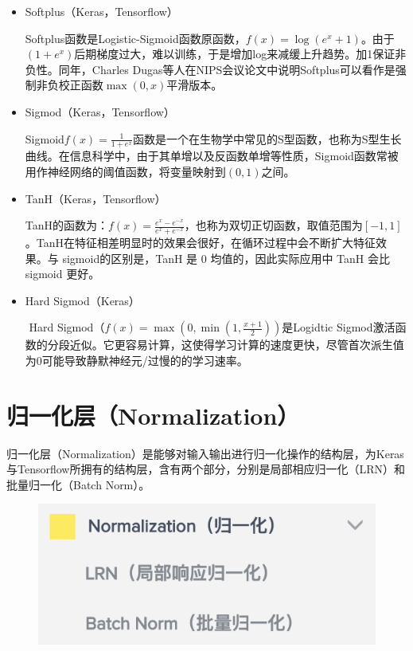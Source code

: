 \documentclass{progbookcn}
\begin{document}
\begin{itemize}
\item Softplus（Keras，Tensorflow）

  ​	Softplus函数是Logistic-Sigmoid函数原函数，$f(x)=\log(e^x+1)$。由于$(1+e^x)$后期梯度过大，难以训练，于是增加log来减缓上升趋势。加1保证非负性。同年，Charles Dugas等人在NIPS会议论文中说明Softplus可以看作是强制非负校正函数$\max(0,x)$平滑版本。

\item Sigmod（Keras，Tensorflow）

  ​	Sigmoid$f(x)=\frac{1}{1+e^x}$函数是一个在生物学中常见的S型函数，也称为S型生长曲线。在信息科学中，由于其单增以及反函数单增等性质，Sigmoid函数常被用作神经网络的阈值函数，将变量映射到$(0,1)$之间。

\item TanH（Keras，Tensorflow）

  ​	TanH的函数为：$f(x)=\frac{e^x-e^{-x}}{e^x+e^{-x}}$，也称为双切正切函数，取值范围为$[-1,1]$。TanH在特征相差明显时的效果会很好，在循环过程中会不断扩大特征效果。与 sigmoid的区别是，TanH 是 0 均值的，因此实际应用中 TanH 会比 sigmoid 更好。

\item Hard Sigmod（Keras）

  ​	Hard Sigmod（$f(x)=\max(0,\min(1,\frac{x+1}{2}))$是Logidtic Sigmod激活函数的分段近似。它更容易计算，这使得学习计算的速度更快，尽管首次派生值为0可能导致静默神经元/过慢的的学习速率。
\end{itemize}

\section{归一化层（Normalization）}

归一化层（Normalization）是能够对输入输出进行归一化操作的结构层，为Keras与Tensorflow所拥有的结构层，含有两个部分，分别是局部相应归一化（LRN）和批量归一化（Batch Norm）。
\begin{figure}[H]
  \centering
  \includegraphics[scale = 0.6]{Normalization_layer.png}
\end{figure}
\end{document}
